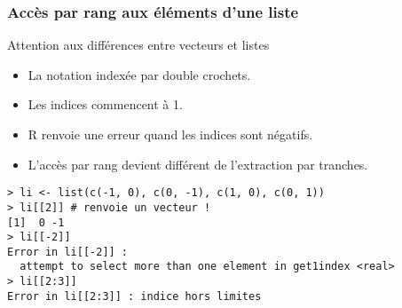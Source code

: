 \documentclass[10pt]{beamer}
\begin{document}
\begin{frame}[fragile]
  \frametitle{Accès par rang aux éléments d'une liste}
  \begin{alertblock}{Attention aux différences entre vecteurs et listes }
  \begin{itemize}
  \item La notation indexée par \alert{double crochets}.
  \item Les indices commencent à 1.
  \item R renvoie une erreur quand les indices sont négatifs.
  \item L'accès par rang devient différent de l'extraction par tranches.
  \end{itemize}
  \end{alertblock}

  \begin{lstlisting}
> li <- list(c(-1, 0), c(0, -1), c(1, 0), c(0, 1))
> li[[2]] # renvoie un vecteur !
[1]  0 -1
> li[[-2]]
Error in li[[-2]] :
  attempt to select more than one element in get1index <real>
> li[[2:3]]
Error in li[[2:3]] : indice hors limites
\end{lstlisting}
\end{frame}
\end{document}
